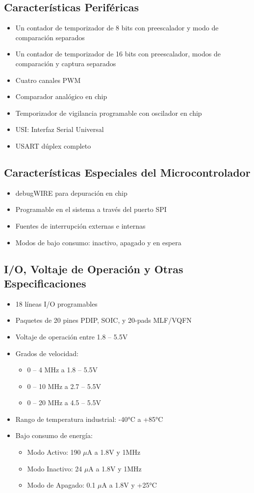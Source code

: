 \subsection{Características Periféricas}
\begin{itemize}
    \item Un contador de temporizador de 8 bits con preescalador y modo de comparación separados
    \item Un contador de temporizador de 16 bits con preescalador, modos de comparación y captura separados
    \item Cuatro canales PWM
    \item Comparador analógico en chip
    \item Temporizador de vigilancia programable con oscilador en chip
    \item USI: Interfaz Serial Universal
    \item USART dúplex completo
\end{itemize}

\subsection{Características Especiales del Microcontrolador}
\begin{itemize}
    \item debugWIRE para depuración en chip
    \item Programable en el sistema a través del puerto SPI
    \item Fuentes de interrupción externas e internas
    \item Modos de bajo consumo: inactivo, apagado y en espera
\end{itemize}
\subsection{I/O, Voltaje de Operación y Otras Especificaciones}
\begin{itemize}
    \item 18 líneas I/O programables
    \item Paquetes de 20 pines PDIP, SOIC, y 20-pads MLF/VQFN
    \item Voltaje de operación entre 1.8 – 5.5V
    \item Grados de velocidad:
    \begin{itemize}
        \item 0 – 4 MHz a 1.8 – 5.5V
        \item 0 – 10 MHz a 2.7 – 5.5V
        \item 0 – 20 MHz a 4.5 – 5.5V
    \end{itemize}
    \item Rango de temperatura industrial: -40°C a +85°C
    \item Bajo consumo de energía:
    \begin{itemize}
        \item Modo Activo: 190 $\mu$A a 1.8V y 1MHz
        \item Modo Inactivo: 24 $\mu$A a 1.8V y 1MHz
        \item Modo de Apagado: 0.1 $\mu$A a 1.8V y +25°C
    \end{itemize}
\end{itemize}
